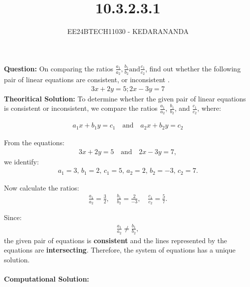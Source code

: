 \documentclass[journal]{IEEEtran}
\begin{document}
	
	
	\vspace{3cm}
	
	\title{10.3.2.3.1}
	\author{EE24BTECH11030 - KEDARANANDA}
	{\let\newpage\relax\maketitle}
	
	\renewcommand{\thefigure}{\theenumi}
	\renewcommand{\thetable}{\theenumi}
	\setlength{\intextsep}{10pt} %
	
	\textbf{Question:}
	\newline
	On comparing the ratios $\frac{a_1}{a_2},\frac{b_1}{b_2} \text{and} \frac{c_1}{c_2}$, find out whether the following pair of linear equations are consistent, or inconsistent . 
	\begin{align}
		3x + 2y = 5 ; 2x - 3y = 7
	\end{align}
	\textbf{Theoritical Solution:}
	To determine whether the given pair of linear equations is consistent or inconsistent, we compare the ratios $\frac{a_1}{a_2}$, $\frac{b_1}{b_2}$, and $\frac{c_1}{c_2}$, where:
	
	\begin{align}
		a_1x + b_1y = c_1 \quad \text{and} \quad a_2x + b_2y = c_2
	\end{align}
	
	From the equations:
	\begin{align}
		3x + 2y = 5 \quad \text{and} \quad 2x - 3y = 7,
	\end{align}
	we identify:
	\begin{align}
		a_1 = 3, \, b_1 = 2, \, c_1 = 5, \, a_2 = 2, \, b_2 = -3, \, c_2 = 7.
	\end{align}
	
	Now calculate the ratios:
	\begin{align}
		\frac{a_1}{a_2} = \frac{3}{2}, \quad \frac{b_1}{b_2} = \frac{2}{-3}, \quad \frac{c_1}{c_2} = \frac{5}{7}.
	\end{align}
	
	Since:
	\begin{align}
		\frac{a_1}{a_2} \neq \frac{b_1}{b_2},
	\end{align}
	the given pair of equations is \textbf{consistent} and the lines represented by the equations are \textbf{intersecting}. Therefore, the system of equations has a unique solution.\\\\
	\textbf{Computational Solution:}
	\newline
\end{document}
